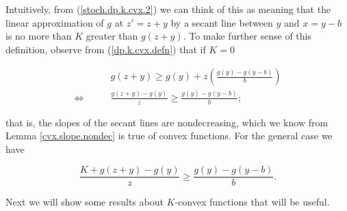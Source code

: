 Intuitively, from (\ref{stoch.dp.k.cvx.2}) we can think of this as meaning that the linear approximation of \(g\) at \(z' = z + y\) by a secant line between \(y\) and \(x = y - b\) is no more than \(K\) greater than \(g(z+y)\). To make further sense of this definition, observe from (\ref{dp.k.cvx.defn}) that if \(K = 0\)

\begin{align*}
&  g(z+y) \geq g(y) + z \left( \frac{ g(y) - g(y-b)}{b} \right)
\\ \iff \qquad &  \frac{  g(z+y) - g(y)}{z} \geq   \frac{ g(y) - g(y-b)}{b} ;
\end{align*}

that is, the slopes of the secant lines are nondecreasing, which we know from Lemma \ref{cvx.slope.nondec} is true of convex functions. For the general case we have

\[
 \frac{ K + g(z+y) - g(y)}{z} \geq   \frac{ g(y) - g(y-b)}{b} .
 \]

Next we will show some results about \(K\)-convex functions that will be useful.

